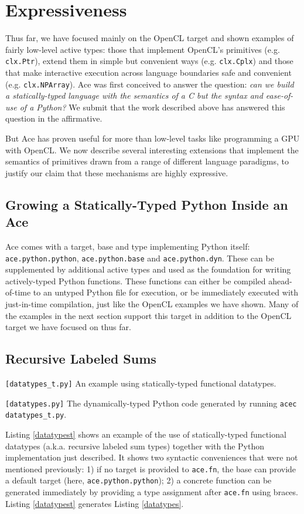 \documentclass[9pt,preprint]{sigplanconf}
\begin{document}
\section{Expressiveness}\label{examples}
Thus far, we have focused mainly on the OpenCL target and shown examples of fairly low-level active types: those that implement OpenCL's primitives (e.g. \verb|clx.Ptr|), extend them in simple but convenient ways (e.g. \verb|clx.Cplx|) and those that make interactive execution across language boundaries safe and convenient (e.g. \verb|clx.NPArray|). 
Ace was first conceived to answer the question: \emph{can we build a statically-typed language with the semantics of a C but the syntax and ease-of-use of a Python?} We submit that the work described above has answered this question in the affirmative. 

But Ace has proven useful for more than low-level tasks like programming a GPU with OpenCL. We now describe several interesting extensions that implement the semantics of primitives drawn from a range of different language paradigms, to justify our claim that these mechanisms are highly expressive. 

\subsection{Growing a Statically-Typed Python Inside an Ace}
Ace comes with a target, base and type implementing Python itself: \verb|ace.python.python|, \verb|ace.python.base| and \verb|ace.python.dyn|. These can be supplemented by additional active types and used as the foundation for writing actively-typed Python functions. These functions can either be compiled ahead-of-time to an untyped Python file for execution, or be immediately executed with just-in-time compilation, just like the OpenCL examples we have shown. Many of the examples in the next section support this target in addition to the OpenCL target we have focused on thus far.

\subsection{Recursive Labeled Sums}
\begin{codelisting}

\caption{\texttt{[datatypes\_t.py]} An example using statically-typed functional datatypes.}
\label{datatypest}
\end{codelisting}
\begin{codelisting}

\caption{\texttt{[datatypes.py]} The dynamically-typed Python code generated by running \texttt{acec datatypes\_t.py}.}
\label{datatypes}
\end{codelisting}
Listing \ref{datatypest} shows an example of the use of statically-typed functional datatypes (a.k.a. recursive labeled sum types) together with the Python implementation just described. It shows two syntactic conveniences that were not mentioned previously: 1) if no target is provided to \verb|ace.fn|, the base can provide a default target (here, \verb|ace.python.python|); 2) a concrete function can be generated immediately by providing a type assignment after \verb|ace.fn| using braces. Listing \ref{datatypest} generates Listing \ref{datatypes}.
\end{document}
